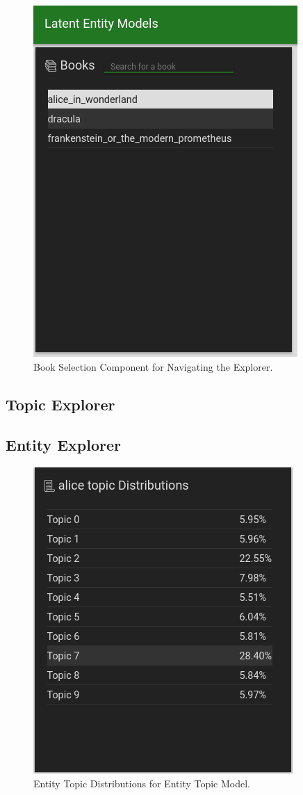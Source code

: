 \documentclass[10pt]{report}
\begin{document}
\begin{figure}[h!]
  \centering
  \includegraphics[scale=0.5]{book_list}
  \caption{Book Selection Component for Navigating the Explorer.\label{fig:book_selection}}
\end{figure}

\subsection{Topic Explorer}


\subsection{Entity Explorer}

\begin{figure}[h!]
  \centering
  \includegraphics[scale=0.5]{topic_dist_pct}
  \caption{Entity Topic Distributions for Entity Topic Model. \label{fig:entity_topic_pct}}
\end{figure}
\end{document}
